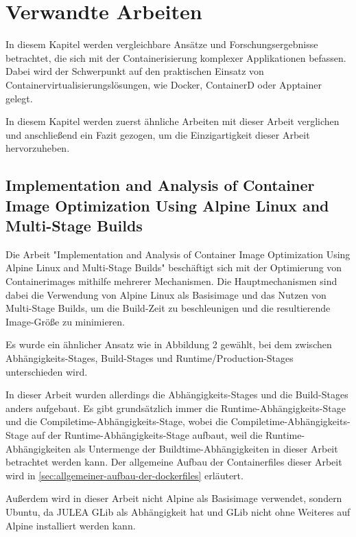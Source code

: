 \chapter{Verwandte Arbeiten}
\label{cha:related-work}

In diesem Kapitel werden vergleichbare Ansätze und Forschungsergebnisse betrachtet, die sich mit der Containerisierung komplexer Applikationen befassen. Dabei wird der Schwerpunkt auf den praktischen Einsatz von Containervirtualisierungslösungen, wie Docker, ContainerD oder Apptainer gelegt.

In diesem Kapitel werden zuerst ähnliche Arbeiten mit dieser Arbeit verglichen und anschließend ein Fazit gezogen, um die Einzigartigkeit dieser Arbeit hervorzuheben.

\section{Implementation and Analysis of Container Image Optimization Using Alpine Linux and Multi-Stage Builds \cite{fachrudinImplementationAnalysisContainer2025}}

Die Arbeit "Implementation and Analysis of Container Image Optimization Using Alpine Linux and Multi-Stage Builds" beschäftigt sich mit der Optimierung von Containerimages mithilfe mehrerer Mechanismen. Die Hauptmechanismen sind dabei die Verwendung von Alpine Linux als Basisimage und das Nutzen von Multi-Stage Builds, um die Build-Zeit zu beschleunigen und die resultierende Image-Größe zu minimieren. 

Es wurde ein ähnlicher Ansatz wie in Abbildung 2 \cite[Vgl. S. 11]{fachrudinImplementationAnalysisContainer2025} gewählt, bei dem zwischen Abhängigkeits-Stages, Build-Stages und Runtime/Production-Stages unterschieden wird. 

In dieser Arbeit wurden allerdings die Abhängigkeits-Stages und die Build-Stages anders aufgebaut. Es gibt grundsätzlich immer die Runtime-Abhängigkeits-Stage und die Compiletime-Abhängigkeits-Stage, wobei die Compiletime-Abhängigkeits-Stage auf der Runtime-Abhängigkeits-Stage aufbaut, weil die Runtime-Abhängigkeiten als Untermenge der Buildtime-Abhängigkeiten in dieser Arbeit betrachtet werden kann. Der allgemeine Aufbau der Containerfiles dieser Arbeit wird in \cref{sec:allgemeiner-aufbau-der-dockerfiles} erläutert. 

Außerdem wird in dieser Arbeit nicht Alpine als Basisimage verwendet, sondern Ubuntu, da JULEA GLib als Abhängigkeit hat und GLib nicht ohne Weiteres auf Alpine installiert werden kann.

